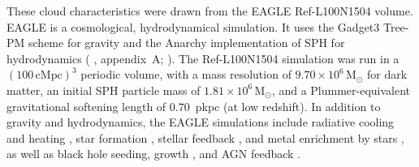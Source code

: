 \documentclass[fleqn,usenatbib]{mnras}
\begin{document}
These cloud characteristics were drawn from the EAGLE Ref-L100N1504 volume.
EAGLE \citep[`Evolution and Assembly of GaLaxies and their Environments';][]{Schaye2015,Crain2015,McAlpine2016} is a cosmological, hydrodynamical simulation.
It uses the Gadget3 Tree-PM scheme for gravity \citep[][]{Springel2005} and the Anarchy implementation of SPH for hydrodynamics (\citeauthor{Schaye2015} \citeyear{Schaye2015}, appendix~A; \citeauthor{Schaller2015} \citeyear{Schaller2015}).
The Ref-L100N1504 simulation was run in a $(100\,\mathrm{cMpc})^3$ periodic volume, with a mass resolution of $9.70 \times 10^6 \,\mathrm{M}_{\odot}$ for dark matter, an initial SPH particle mass of $1.81 \times 10^6 \,\mathrm{M}_{\odot}$, and a Plummer-equivalent gravitational softening length of $0.70$~pkpc (at low redshift).
In addition to gravity and hydrodynamics, the EAGLE simulations include radiative cooling and heating \citep{Wiersma2009a}, star formation \citep{Schaye2004, Schaye2008}, stellar feedback \citep{DallaVecchia2012}, and metal enrichment by stars \citet{Wiersma2009}, as well as black hole seeding, growth \citet{Rosas-Guevara2015}, and AGN feedback \citet{Booth2009}.
\end{document}
